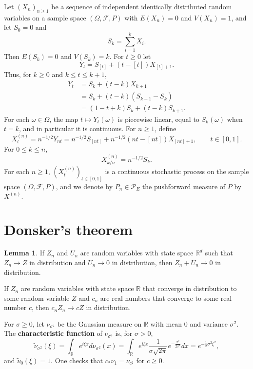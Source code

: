 \documentclass{article}
\theoremstyle{definition}
\newtheorem{lemma}[theorem]{Lemma}
\theoremstyle{definition}
\begin{document}
Let $(X_n)_{n \geq 1}$ be a sequence of independent identically distributed random variables on a sample space
$(\Omega,\mathscr{F},P)$ with $E(X_n)=0$ and $V(X_n)=1$, and let $S_0=0$ and
\[
S_k = \sum_{i=1}^k X_i.
\]
Then $E(S_k)=0$ and $V(S_k) = k$. 
For $t \geq 0$ let 
\[
Y_t = S_{[t]} + (t-[t]) X_{[t]+1}.
\]
Thus, for $k \geq 0$ and $k \leq t \leq k+1$,
\begin{align*}
Y_t &= S_k + (t-k) X_{k+1}\\
& = S_k + (t-k) (S_{k+1}-S_k)\\
& = (1-t+k)S_k +(t-k)S_{k+1}.
\end{align*}
For each $\omega \in \Omega$, the map $t \mapsto Y_t(\omega)$ is piecewise linear, equal to $S_k(\omega)$ when $t=k$, and in particular
it is continuous. 
For $n \geq 1$, define
\begin{equation}
X_t^{(n)} = n^{-1/2} Y_{nt} = n^{-1/2} S_{[nt]} + n^{-1/2}(nt-[nt])X_{[nt]+1}, \qquad t \in [0,1].
\label{Xtn}
\end{equation}
For $0 \leq k \leq n$,
\[
X_{k/n}^{(n)} = n^{-1/2} S_k.
\]
For each $n \geq 1$, $(X^{(n)}_t)_{t \in [0,1]}$ is a continuous stochastic process on the sample space $(\Omega,\mathscr{F},P)$, and we denote
by $P_n \in \mathscr{P}_E$ the pushforward measure of $P$ by $X^{(n)}$. 




\section{Donsker's theorem}
\begin{lemma}
If $Z_n$ and $U_n$ are random variables with state space $\mathbb{R}^d$ such that
$Z_n \to Z$ in distribution and $U_n \to 0$ in distribution, then $Z_n + U_n \to 0$ in distribution.

If $Z_n$ are random variables  with state space $\mathbb{R}$ that converge
in distribution to some random variable $Z$ and $c_n$ are real numbers that converge to some real number $c$, then
$c_n Z_n \to cZ$ in distribution. 
\label{191}
\end{lemma}

For $\sigma \geq 0$, let $\nu_{\sigma^2}$ be the Gaussian measure on $\mathbb{R}$ with mean $0$ and
variance $\sigma^2$.
The \textbf{characteristic function} of $\nu_{\sigma^2}$ is, for $\sigma > 0$,
\[
\widetilde{\nu}_{\sigma^2}(\xi) = \int_{\mathbb{R}} e^{i\xi x} d\nu_{\sigma^2}(x) = 
\int_{\mathbb{R}} e^{i\xi x} \frac{1}{\sigma \sqrt{2\pi}} e^{-\frac{x^2}{2\sigma^2}} dx
=e^{-\frac{1}{2}\sigma^2 \xi^2},
\]
and $\widetilde{\nu}_0(\xi) = 1$. One checks that $c_* \nu_1 = \nu_{c^2}$ for $c \geq 0$. 
\end{document}
